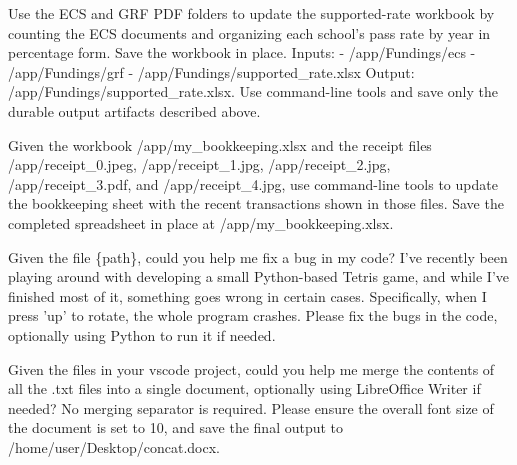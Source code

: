 \begin{instructionbox}
Use the ECS and GRF PDF folders to update the supported-rate workbook by counting the ECS documents and organizing each school's pass rate by year in percentage form. Save the workbook in place.
Inputs:
- \textasciigrave{}/app/Fundings/ecs\textasciigrave{}
- \textasciigrave{}/app/Fundings/grf\textasciigrave{}
- \textasciigrave{}/app/Fundings/supported\_rate.xlsx\textasciigrave{}
Output: \textasciigrave{}/app/Fundings/supported\_rate.xlsx\textasciigrave{}.
Use command-line tools and save only the durable output artifacts described above.
\end{instructionbox}

\begin{instructionbox}
Given the workbook \textasciigrave{}/app/my\_bookkeeping.xlsx\textasciigrave{} and the receipt files \textasciigrave{}/app/receipt\_0.jpeg\textasciigrave{}, \textasciigrave{}/app/receipt\_1.jpg\textasciigrave{}, \textasciigrave{}/app/receipt\_2.jpg\textasciigrave{}, \textasciigrave{}/app/receipt\_3.pdf\textasciigrave{}, and \textasciigrave{}/app/receipt\_4.jpg\textasciigrave{}, use command-line tools to update the bookkeeping sheet with the recent transactions shown in those files. Save the completed spreadsheet in place at \textasciigrave{}/app/my\_bookkeeping.xlsx\textasciigrave{}.
\end{instructionbox}

\begin{instructionbox}
Given the file \{path\}, could you help me fix a bug in my code? I've recently been playing around with developing a small Python-based Tetris game, and while I've finished most of it, something goes wrong in certain cases. Specifically, when I press 'up' to rotate, the whole program crashes. Please fix the bugs in the code, optionally using Python to run it if needed.
\end{instructionbox}

\begin{instructionbox}
Given the files in your vscode project, could you help me merge the contents of all the .txt files into a single document, optionally using LibreOffice Writer if needed? No merging separator is required. Please ensure the overall font size of the document is set to 10, and save the final output to \textasciigrave{}/home/user/Desktop/concat.docx\textasciigrave{}.
\end{instructionbox}

